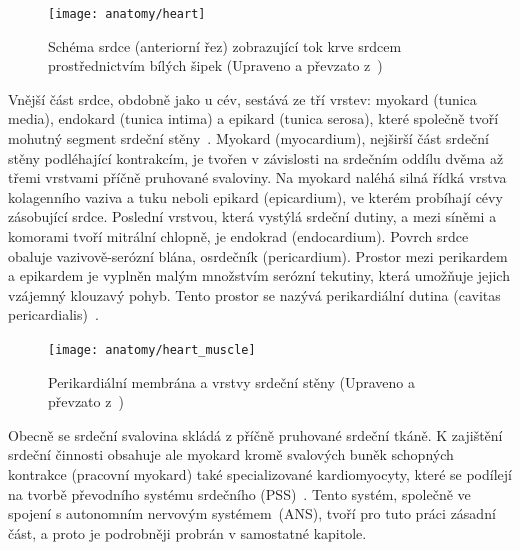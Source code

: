 \begin{figure}[h]
	\begin{center}
		\texttt{[image: anatomy/heart]}
		\caption{Schéma srdce (anteriorní řez) zobrazující tok krve srdcem
			prostřednictvím bílých šipek (Upraveno a převzato
			z~\cite{OpenStax})}
		\label{fig:heartanatomy}
	\end{center}
\end{figure}

Vnější část srdce, obdobně jako u cév, sestává ze tří vrstev: myokard (tunica
media), endokard (tunica intima) a epikard (tunica serosa), které společně tvoří
mohutný segment srdeční stěny~\cite{Memorix2017}. Myokard (myocardium), nejširší
část srdeční stěny podléhající kontrakcím, je tvořen v závislosti na srdečním
oddílu dvěma až třemi vrstvami příčně pruhované svaloviny. Na myokard naléhá
silná řídká vrstva kolagenního vaziva a tuku neboli epikard (epicardium), ve
kterém probíhají cévy zásobující srdce. Poslední vrstvou, která vystýlá srdeční
dutiny, a mezi síněmi a komorami tvoří mitrální chlopně, je endokrad
(endocardium). Povrch srdce obaluje vazivově-serózní blána, osrdečník
(pericardium). Prostor mezi perikardem a epikardem je vyplněn malým množstvím
serózní tekutiny, která umožňuje jejich vzájemný klouzavý pohyb. Tento prostor
se nazývá perikardiální dutina (cavitas
pericardialis)~\cite{Weinhaus2005,Dylevsky2013}.

\begin{figure}[h]
	\begin{center}
		\texttt{[image: anatomy/heart\_muscle]}
		\caption{Perikardiální membrána a vrstvy srdeční stěny (Upraveno a
			převzato z~\cite{OpenStax})}
		\label{fig:heartlayers}
	\end{center}
\end{figure}

Obecně se srdeční svalovina skládá z příčně pruhované srdeční tkáně. K zajištění
srdeční činnosti obsahuje ale myokard kromě svalových buněk schopných kontrakce
(pracovní myokard) také specializované kardiomyocyty, které se podílejí na
tvorbě převodního systému srdečního (PSS)~\cite{Memorix2017,Dylevsky2013}. Tento
systém, společně ve spojení s autonomním nervovým systémem~(ANS), tvoří pro tuto
práci zásadní část, a proto je podrobněji probrán v samostatné kapitole.

